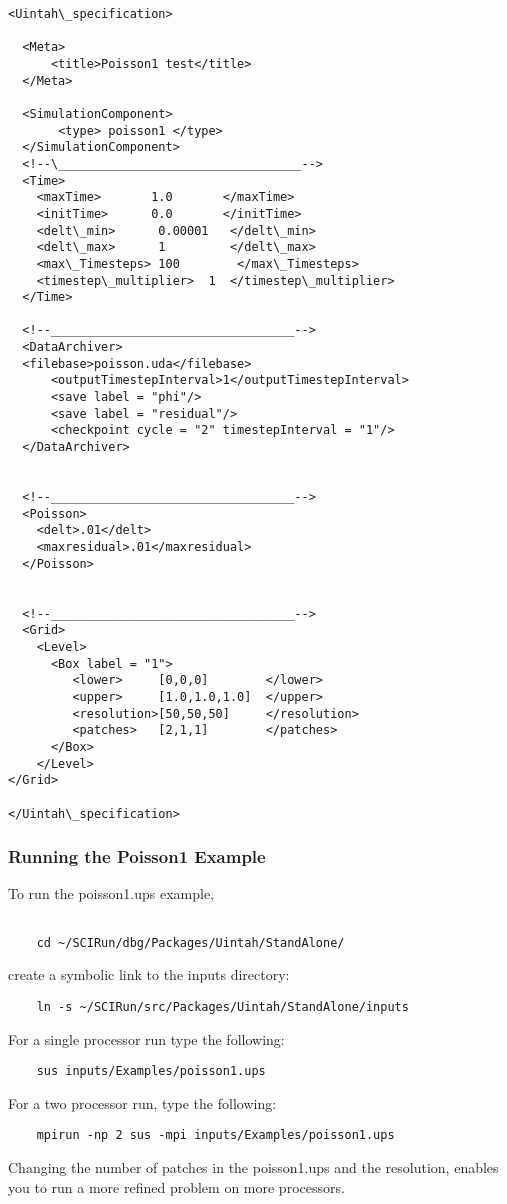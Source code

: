 \documentclass[12pt]{report}
\begin{document}
\begin{verbatim}
<Uintah\_specification>

  <Meta>
      <title>Poisson1 test</title>
  </Meta>

  <SimulationComponent>
       <type> poisson1 </type>
  </SimulationComponent>
  <!--\__________________________________-->
  <Time>
    <maxTime>       1.0       </maxTime>
    <initTime>      0.0       </initTime>
    <delt\_min>      0.00001   </delt\_min>
    <delt\_max>      1         </delt\_max>
    <max\_Timesteps> 100        </max\_Timesteps>
    <timestep\_multiplier>  1  </timestep\_multiplier>
  </Time>

  <!--__________________________________-->
  <DataArchiver>
  <filebase>poisson.uda</filebase>
      <outputTimestepInterval>1</outputTimestepInterval>
      <save label = "phi"/>
      <save label = "residual"/>
      <checkpoint cycle = "2" timestepInterval = "1"/>
  </DataArchiver>


  <!--__________________________________-->
  <Poisson>
    <delt>.01</delt>
    <maxresidual>.01</maxresidual>
  </Poisson>


  <!--__________________________________-->
  <Grid>
    <Level>
      <Box label = "1">
         <lower>     [0,0,0]        </lower>
         <upper>     [1.0,1.0,1.0]  </upper>
         <resolution>[50,50,50]     </resolution>
         <patches>   [2,1,1]        </patches>
      </Box>
    </Level>
</Grid>

</Uintah\_specification>

\end{verbatim}


\subsubsection{Running the Poisson1 Example}

To run the poisson1.ups example, 
\begin{verbatim}

	cd ~/SCIRun/dbg/Packages/Uintah/StandAlone/
\end{verbatim}

create a symbolic link to the inputs directory:
\begin{verbatim}
	ln -s ~/SCIRun/src/Packages/Uintah/StandAlone/inputs
\end{verbatim}
For a single processor run type the following:
\begin{verbatim}
	sus inputs/Examples/poisson1.ups
\end{verbatim}
For a two processor run, type the following:
\begin{verbatim}
	mpirun -np 2 sus -mpi inputs/Examples/poisson1.ups
\end{verbatim}
Changing the number of patches in the poisson1.ups and the resolution,
enables you to run a more refined problem on more processors.
\end{document}
